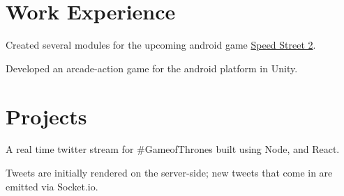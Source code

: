 \documentclass[a4paper]{resume}
\begin{document}
\begin{minipage}[t]{0.66\textwidth} %


\section{Work Experience}


\vspace{\topsep} %
\begin{tightitemize}
\item Created several modules for the upcoming android game {\href{https://play.google.com/store/apps/details?id=com.firexit.speedstreet2VRdemo}{Speed Street 2}}.
\item Developed an arcade-action game for the android platform in Unity.
\end{tightitemize}

\sectionspace %


\section{Projects}



\begin{tightitemize}
\item A real time twitter stream for \#GameofThrones built using Node, and React.
\item Tweets are initially rendered on the server-side; new tweets that come in are emitted via Socket.io.
\end{tightitemize}

\sectionspace %




\end{minipage}
\end{document}
